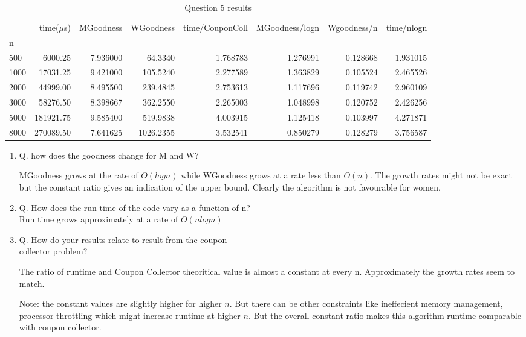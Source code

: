 \documentclass{homeworg}
\begin{document}
\begin{table}
\centering
\caption{Question 5 results}
\label{table:q5}
\small\addtolength{\tabcolsep}{-1pt}
\begin{tabular}{lrrrrrrr}
\toprule
{} &  time($\mu$s) &  MGoodness &  WGoodness &  time/CouponColl &  MGoodness/logn &  Wgoodness/n &  time/nlogn \\
n    &              &            &            &                              &                 &              &             \\
\midrule
500  &      6000.25 &   7.936000 &    64.3340 &                     1.768783 &        1.276991 &     0.128668 &    1.931015 \\
1000 &     17031.25 &   9.421000 &   105.5240 &                     2.277589 &        1.363829 &     0.105524 &    2.465526 \\
2000 &     44999.00 &   8.495500 &   239.4845 &                     2.753613 &        1.117696 &     0.119742 &    2.960109 \\
3000 &     58276.50 &   8.398667 &   362.2550 &                     2.265003 &        1.048998 &     0.120752 &    2.426256 \\
5000 &    181921.75 &   9.585400 &   519.9838 &                     4.003915 &        1.125418 &     0.103997 &    4.271871 \\
8000 &    270089.50 &   7.641625 &  1026.2355 &                     3.532541 &        0.850279 &     0.128279 &    3.756587 \\
\bottomrule
\end{tabular}
\end{table}

\begin{enumerate}
    \item Q. how does the goodness change for M and W?

MGoodness grows at the rate of $O(logn)$ while WGoodness grows at a rate less than $O(n)$. The growth rates might not be exact but the constant ratio gives an indication of the upper bound. Clearly the algorithm is not favourable for women.

    \item Q. How does the run time of the code vary as a function of n?\\

Run time grows approximately at a rate of $O(n log n )$

    \item Q. How do your results relate to result from the coupon\\ collector problem?

The ratio of runtime and Coupon Collector theoritical value is almost a constant at every n. Approximately the growth rates seem to match. 

Note: the constant values are slightly higher for higher $n$. But there can be other constraints like ineffecient memory management, processor throttling which might increase runtime at higher $n$. But the overall constant ratio makes this algorithm runtime comparable with coupon collector. 
\end{enumerate}
\end{document}

